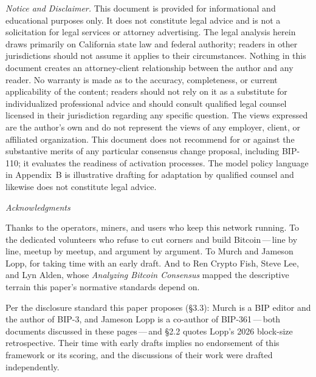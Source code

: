 \documentclass[11pt, twoside, openright]{book}
\newcommand{\sect}[1]{\S#1}
\begin{document}
{\begin{flushleft}
\vspace{0.8cm}
\textit{Notice and Disclaimer.} This document is provided for informational and educational purposes only. It does not constitute legal advice and is not a solicitation for legal services or attorney advertising. The legal analysis herein draws primarily on California state law and federal authority; readers in other jurisdictions should not assume it applies to their circumstances. Nothing in this document creates an attorney-client relationship between the author and any reader. No warranty is made as to the accuracy, completeness, or current applicability of the content; readers should not rely on it as a substitute for individualized professional advice and should consult qualified legal counsel licensed in their jurisdiction regarding any specific question. The views expressed are the author's own and do not represent the views of any employer, client, or affiliated organization. This document does not recommend for or against the substantive merits of any particular consensus change proposal, including BIP-110; it evaluates the readiness of activation processes. The model policy language in Appendix~B is illustrative drafting for adaptation by qualified counsel and likewise does not constitute legal advice.
\end{flushleft}
}%
\clearpage

\thispagestyle{empty}
{}
\vspace*{0.4in}
\begin{center}
{\large\itshape Acknowledgments}
\end{center}
\vspace{1.5em}

Thanks to the operators, miners, and users who keep this network running. To the dedicated volunteers who refuse to cut corners and build Bitcoin\,---\,line by line, meetup by meetup, and argument by argument. To Murch and Jameson Lopp, for taking time with an early draft. And to Ren Crypto Fish, Steve Lee, and Lyn Alden, whose \textit{Analyzing Bitcoin Consensus} mapped the descriptive terrain this paper's normative standards depend on.

Per the disclosure standard this paper proposes (\sect{3.3}): Murch is a BIP editor and the author of BIP-3, and Jameson Lopp is a co-author of BIP-361\,---\,both documents discussed in these pages\,---\,and \sect{2.2} quotes Lopp's 2026 block-size retrospective. Their time with early drafts implies no endorsement of this framework or its scoring, and the discussions of their work were drafted independently.
\end{document}

